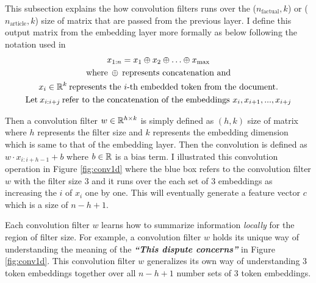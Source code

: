 \documentclass[12pt,letterpaper]{article}
\begin{document}
This subsection explains the how convolution filters runs over the ($n_{\text{factual}}, k$) or ($n_{\text{article}}, k$) size of matrix that are passed from the previous layer.
I define this output matrix from the embedding layer more formally as below following the notation used in \cite{textcnn}
\begin{gather}
 \nonumber x_{1:n} = x_1 \oplus x_2 \oplus \ldots \oplus x_{\text{max}}\\
 \nonumber \text{where\:} \oplus \: \text{represents concatenation and} \\
 \nonumber x_i \in \Bbb R^k \: \text{represents the $i$-th embedded token from the document.}\\
 \nonumber \text{Let} \: x_{i:i+j} \: \text{refer to the concatenation of the embeddings } x_i, x_{i+1}, . . . , x_{i+j}
\end{gather}
 
 
\noindent Then a convolution filter $w \in \Bbb R^{h \times k}$ is simply defined as $(h, k)$ size of matrix where $h$ represents the filter size and $k$ represents the embedding dimension which is same to that of the embedding layer.
Then the convolution is defined as $w \cdot x_{i:i+h-1} + b$ where $b \in \Bbb R$ is a bias term.
I illustrated this convolution operation in Figure \ref{fig:conv1d} where the blue box refers to the convolution filter $w$ with the filter size 3 and it runs over the
each set of 3 embeddings as increasing the $i$ of $x_i$ one by one. This will eventually generate a feature vector $c$ which is a size of $n-h+1$.
 
Each convolution filter $w$ learns how to summarize information \textit{locally} for the region of filter size. For example, a convolution filter $w$ holds its unique way of
understanding the meaning of the \textit{\textbf{``This dispute concerns''}} in Figure \ref{fig:conv1d}.
This convolution filter $w$ generalizes its own way of understanding 3 token embeddings together over all $n-h+1$ number sets of 3 token embeddings.
 
\end{document}
